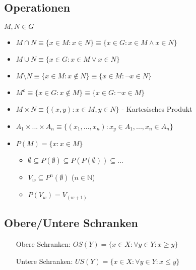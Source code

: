 \documentclass[12pt]{scrreprt}
\begin{document}
            \subsection{Operationen}
                \label{ss:grundbegriffe_mengen_operationen}

                $ M, N \in G $

                \begin{itemize}
                    \item $ M \cap N \equiv \{ x \in M : x \in N \} \equiv \{ x \in G : x \in M \land x \in N \} $
                    \item $ M \cup N \equiv \{ x \in G : x \in M \lor x \in N \} $
                    \item $ M \setminus N \equiv \{ x \in M : x \not\in N \} \equiv \{ x \in M : \lnot x \in N \} $
                    \item $ M ^ \mathsf{c} \equiv \{ x \in G : x \not\in M \} \equiv \{ x \in G : \lnot x \in M \} $
                    \item $ M \times N \equiv \{ (x, y) : x \in M , y \in N \} $ - Kartesisches Produkt
                    \item $ A _ 1 \times ... \times A _ n \equiv \{ (x _ 1, ..., x _ n) : x _ y \in A _ 1, ..., x _ n \in A _ n \} $
                    \item $ P(M) = \{ x : x \in M \} $
                    \begin{itemize}
                        \item $ \emptyset \subseteq P(\emptyset) \subseteq P(P(\emptyset)) \subseteq ... $
                        \item $ V _ w \subseteq P ^ n (\emptyset) $ ($ n \in \mathbb{N} $)
                        \item $ P(V _ w) = V _ (w + 1) $
                    \end{itemize}
                \end{itemize}


            \subsection{Obere/Untere Schranken}
                \label{ss:grundbegriffe_mengen_schranken}

                \begin{itemize}
                    \item[Obere Schranken:] $ OS(Y) = \{ x \in X : \forall y \in Y : x \geq y \} $
                    \item[Untere Schranken:] $ US(Y) = \{ x \in X : \forall y \in Y : x \leq y \} $
                \end{itemize}
\end{document}
